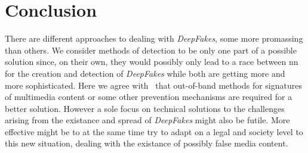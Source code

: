 \section{Conclusion}
There are different approaches to dealing with \textit{DeepFakes}, some more
promassing than others.
We consider methods of detection to be only one part of a possible solution since,
on their own, they would possibly only lead to a race between \gls{nn} for
the creation and detection of \textit{DeepFakes} while both are getting more and
more sophisticated. Here we agree with~\textcite{mirsky_creation_2020} that 
out-of-band methods for signatures of multimedia content or some other prevention
mechanisms are required for a better solution.
However a sole focus on technical solutions to the challenges arising from the 
existance and spread of \textit{DeepFakes} might also be futile. More effective
might be to at the same time try to adapt on a legal and society level to this
new situation, dealing with the existance of possibly false media content.
